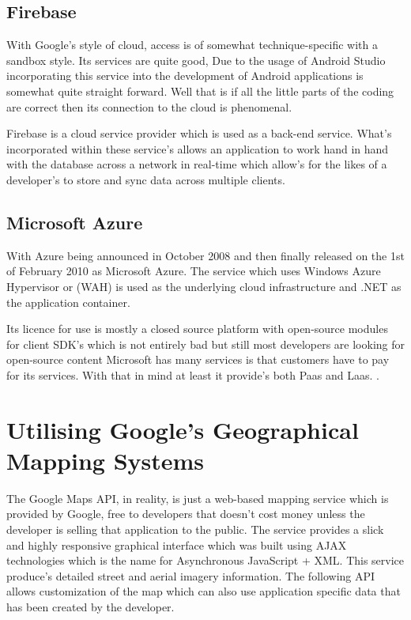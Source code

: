 \subsection{Firebase}
With Google's style of cloud, access is of somewhat technique-specific with a sandbox style. Its services are quite good, Due to the usage of Android Studio incorporating this service into the development of Android applications is somewhat quite straight forward. Well that is if all the little parts of the coding are correct then its connection to the cloud is phenomenal. \cite{qian2009cloud}

Firebase is a cloud service provider which is used as a back-end service. What's incorporated within these service's allows an application to work hand in hand with the database across a network in real-time which allow's for the likes of a developer's to store and sync data across multiple clients. \cite{firebase}

\subsection{Microsoft Azure}
With Azure being announced in October 2008 and then finally released on the 1st of February 2010 as Microsoft Azure. The service which uses Windows Azure Hypervisor or (WAH) is used as the underlying cloud infrastructure and .NET as the application container. \cite{qian2009cloud}

Its licence for use is mostly a closed source platform with open-source modules for client SDK's which is not entirely bad but still most developers are looking for open-source content Microsoft has many services is that customers have to pay for its services. With that in mind at least it provide's both Paas and Laas. \cite{WindowsAzureName}.

\section{Utilising Google's Geographical Mapping Systems }
The Google Maps API, in reality, is just a web-based mapping service which is provided by Google, free to developers that doesn't cost money unless the developer is selling that application to the public. The service provides a slick and highly responsive graphical interface which was built using AJAX technologies which is the name for Asynchronous JavaScript + XML. This service produce's detailed street and aerial imagery information. The following API allows customization of the map which can also use application specific data that has been created by the developer. \par

